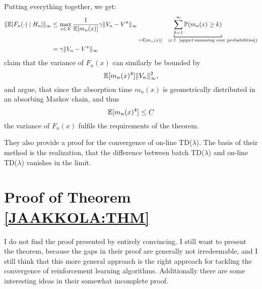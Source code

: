 
Putting everything together, we get:
\begin{align*}
    \|\E[F_n(\cdot)\mid H_n]\|_\infty 
    &\le \max_{x\in\cX}\frac{1}{\E[m_n(x)]}
    \gamma \|V_n-V^\pi\|_\infty 
    \underbracket[0.7pt]{
        \sum_{k=1}^\infty
            \Pr(m_n(x)\ge k)
    }_{=\E[m_n(x)] \quad \text{(c.f. \ref{appx1:summing over probabilities})}}\\
    &=\gamma \|V_n-V^\pi\|_\infty
\end{align*}
\textcite{jaakkolaConvergenceStochasticIterative1994a} claim that the variance of \(F_n(x)\) can similarly be bounded by 
\[
    \mathbb{E}[m_n(x)^4]\|V_n\|_\infty^2,
\]
and argue, that since the absorption time \(m_n(x)\) is geometrically distributed in an absorbing Markov chain, and thus
\[
    \mathbb{E}[m_n(x)^4]\le C
\]
the variance of \(F_n(x)\) fulfils the requirements of the theorem.

They also provide a proof for the convergence of on-line TD(\(\lambda\)). The basis of their method is the realization, that the difference between batch TD(\(\lambda\)) and on-line TD(\(\lambda\)) vanishes in the limit. 

\section{Proof of Theorem \ref{JAAKKOLA:THM}}
I do not find the proof presented by \citeauthor{jaakkolaConvergenceStochasticIterative1994a} entirely convincing. I still want to present the theorem, because the gaps in their proof are generally not irredeemable, and I still think that this more general approach is the right approach for tackling the convergence of reinforcement learning algorithms. Additionally there are some interesting ideas in their somewhat incomplete proof.

